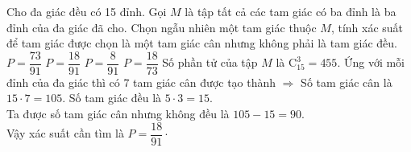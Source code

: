 \begin{ex}%
Cho đa giác đều có 15 đỉnh. Gọi $ M $ là tập tất cả các tam giác có ba đỉnh là ba đỉnh của đa giác đã cho. Chọn ngẫu nhiên một tam giác thuộc $ M $, tính xác suất để tam giác được chọn là một tam giác cân nhưng không phải là tam giác đều.
\choice
{$P = \dfrac{73}{91}$}
{\True $P = \dfrac{18}{91}$}
{$P = \dfrac{8}{91}$}
{ $P = \dfrac{18}{73}$}
	\loigiai
	{Số phần tử của tập $ M $ là $ \mathrm{C}_{15}^3 = 455. $
	Ứng với mỗi đỉnh của đa giác thì có 7 tam giác cân được tạo thành $ \Rightarrow $	Số tam giác cân là $ 15 \cdot 7 = 105 $.
	Số tam giác đều là $ 5 \cdot 3 = 15. $\\
	Ta được số tam giác cân nhưng không đều là $ 105 - 15 = 90 $.\\
	Vậy xác suất cần tìm là $P = \dfrac{18}{91} \cdot $
	}
\end{ex}

